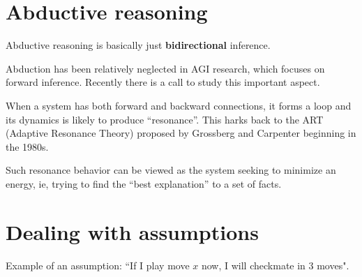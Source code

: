 \section{Abductive reasoning}

Abductive reasoning is basically just \textbf{bidirectional} inference.

Abduction has been relatively neglected in AGI research, which focuses on forward inference.  Recently there is a call to study this important aspect.

When a system has both forward and backward connections, it forms a loop and its dynamics is likely to produce ``resonance''.  This harks back to the ART (Adaptive Resonance Theory) proposed by Grossberg and Carpenter beginning in the 1980s.

Such resonance behavior can be viewed as the system seeking to minimize an energy, ie, trying to find the ``best explanation'' to a set of facts.  

\section{Dealing with assumptions}

Example of an assumption:  ``If I play move $x$ now, I will checkmate in 3 moves".

